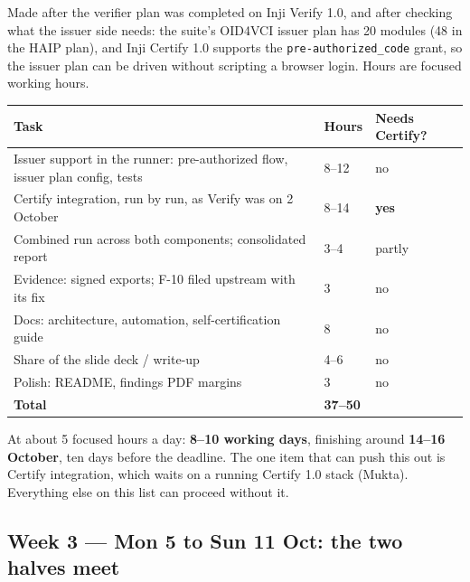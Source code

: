 \documentclass[10pt,a4paper]{article}
\newcommand{\us}{\_}
\begin{document}
Made after the verifier plan was completed on Inji Verify 1.0, and after checking what the
issuer side needs: the suite's OID4VCI issuer plan has 20 modules (48 in the HAIP plan), and
Inji Certify 1.0 supports the \texttt{pre-authorized\us{}code} grant, so the issuer plan can be
driven without scripting a browser login. Hours are focused working hours.

\begin{longtable}{@{}p{11.6cm}p{2cm}p{2.4cm}@{}}
\toprule
Task & Hours & Needs Certify?\\
\midrule
\endhead
Issuer support in the runner: pre-authorized flow, issuer plan config, tests & 8--12 & no\\
Certify integration, run by run, as Verify was on 2 October & 8--14 & \textbf{yes}\\
Combined run across both components; consolidated report & 3--4 & partly\\
Evidence: signed exports; F-10 filed upstream with its fix & 3 & no\\
Docs: architecture, automation, self-certification guide & 8 & no\\
Share of the slide deck / write-up & 4--6 & no\\
Polish: README, findings PDF margins & 3 & no\\
\midrule
\textbf{Total} & \textbf{37--50} & \\
\bottomrule
\end{longtable}

At about 5 focused hours a day: \textbf{8--10 working days}, finishing around
\textbf{14--16 October}, ten days before the deadline. The one item that can push this out is
Certify integration, which waits on a running Certify 1.0 stack (Mukta). Everything else on
this list can proceed without it.

\subsection{Week 3 --- Mon 5 to Sun 11 Oct: the two halves meet}
\end{document}
